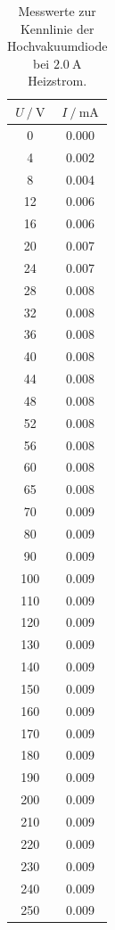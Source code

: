 \begin{table}
  \centering
  \caption{Messwerte zur Kennlinie der Hochvakuumdiode bei $\SI{2.0}{\ampere}$ Heizstrom.}
  \label{tab:a20tab}
  \begin{tabular}{S[table-format=3.0] S[table-format=1.3]}
    \toprule
    {$U \:/\: \si{\volt}$} & {$I \:/\: \si{\milli\ampere}$}\\
    	   & 0.000 \\
    4	   & 0.002 \\
    8	   & 0.004 \\
    12	 & 0.006 \\
    16	 & 0.006 \\
    20	 & 0.007 \\
    24	 & 0.007 \\
    28	 & 0.008 \\
    32	 & 0.008 \\
    36	 & 0.008 \\
    40	 & 0.008 \\
    44	 & 0.008 \\
    48	 & 0.008 \\
    52	 & 0.008 \\
    56	 & 0.008 \\
    60	 & 0.008 \\
    65	 & 0.008 \\
    70	 & 0.009 \\
    80	 & 0.009 \\
    90	 & 0.009 \\
    100	 & 0.009 \\
    110	 & 0.009 \\
    120	 & 0.009 \\
    130	 & 0.009 \\
    140	 & 0.009 \\
    150	 & 0.009 \\
    160	 & 0.009 \\
    170	 & 0.009 \\
    180	 & 0.009 \\
    190	 & 0.009 \\
    200	 & 0.009 \\
    210	 & 0.009 \\
    220	 & 0.009 \\
    230	 & 0.009 \\
    240	 & 0.009 \\
    250	 & 0.009 \\
  \end{tabular}
\end{table}

